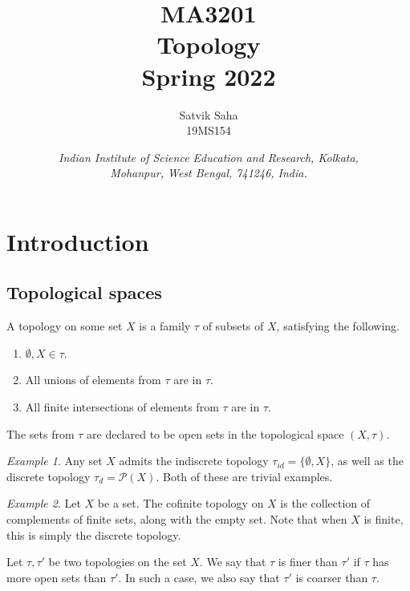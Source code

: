 \documentclass[11pt]{article}
\title{
    \Large\textsc{MA3201} \\
    \Huge \textbf{Topology} \\
    \vspace{5pt}
    \Large{Spring 2022}
}
\author{
    \large Satvik Saha
    \\\textsc{\small 19MS154}
}
\date{\normalsize
    \textit{Indian Institute of Science Education and Research, Kolkata, \\
    Mohanpur, West Bengal, 741246, India.} \\
}
\theoremstyle{definition}
\theoremstyle{remark}
\newtheorem*{example}{Example}
\numberwithin{equation}{section}
\begin{document}
    \maketitle

    \tableofcontents

    \section{Introduction}
    
    \subsection{Topological spaces}

    \begin{definition}
        A topology on some set $X$ is a family $\tau$ of subsets of $X$,
        satisfying the following.
        \begin{enumerate}
            \itemsep0em
            \item $\emptyset, X \in \tau$.
            \item All unions of elements from $\tau$ are in $\tau$.
            \item All finite intersections of elements from $\tau$ are in $\tau$.
        \end{enumerate}
        The sets from $\tau$ are declared to be open sets in the topological space
        $(X, \tau)$.
    \end{definition}
    \begin{example}
        Any set $X$ admits the indiscrete topology $\tau_{id} = \{\emptyset, X\}$, as
        well as the discrete topology $\tau_{d} = \mathcal{P}(X)$. Both of these are
        trivial examples.
    \end{example}
    \begin{example}
        Let $X$ be a set. The cofinite topology on $X$ is the collection of
        complements of finite sets, along with the empty set. Note that when $X$ is
        finite, this is simply the discrete topology.
    \end{example}

    \begin{definition}
        Let $\tau, \tau'$ be two topologies on the set $X$. We say that $\tau$ is
        finer than $\tau'$ if $\tau$ has more open sets than $\tau'$. In such a case,
        we also say that $\tau'$ is coarser than $\tau$.
    \end{definition}
\end{document}
